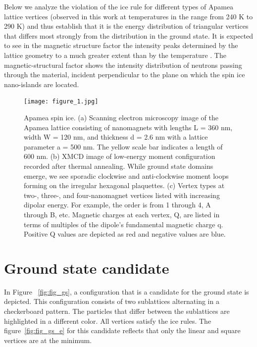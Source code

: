 \documentclass[pre,reprint,superscriptaddress]{revtex4-2}
\begin{document}
Below we analyze the violation of the ice rule for different types of Apamea lattice vertices (observed in this work at temperatures in the range from 240 K to 290 K) and thus establish that it is the energy distribution of triangular vertices that differs most strongly from the distribution in the ground state. It is expected to see in the magnetic structure factor the intensity peaks determined by the lattice geometry to a much greater extent than by the temperature \cite{Farhan2019, Farhan2020}. The magnetic-structural factor shows the intensity distribution of neutrons passing through the material, incident perpendicular to the plane on which the spin ice nano-islands are located.


\begin{figure}
  \texttt{[image: figure\_1.jpg]}
  \caption{\label{fig:fig1}Apamea spin ice. (a) Scanning electron microscopy image of the Apamea lattice consisting of nanomagnets with lengths L = 360 nm, width W = 120 nm, and thickness d = 2.6 nm with a lattice parameter a = 500 nm. The yellow scale bar indicates a length of 600 nm. (b) XMCD image of low-energy moment configuration recorded after thermal annealing. While ground state domains emerge, we see sporadic clockwise and anti-clockwise moment loops forming on the irregular hexagonal plaquettes. (c) Vertex types at two-, three-, and four-nanomagnet vertices listed with increasing dipolar energy. For example, the order is from 1 through 4, A through B, etc. Magnetic charges at each vertex, Q, are listed in terms of multiples of the dipole’s fundamental magnetic charge q. Positive Q values are depicted as red and negative values are blue. }
\end{figure}

\section{Ground state candidate}

In Figure ~\ref{fig:fig_gs}, a configuration that is a candidate for the ground state is depicted. This configuration consists of two sublattices alternating in a checkerboard pattern. The particles that differ between the sublattices are highlighted in a different color. All vertices satisfy the ice rules. The figure~\ref{fig:fig_gs_e} for this candidate reflects that only the linear and square vertices are at the minimum.
\end{document}
